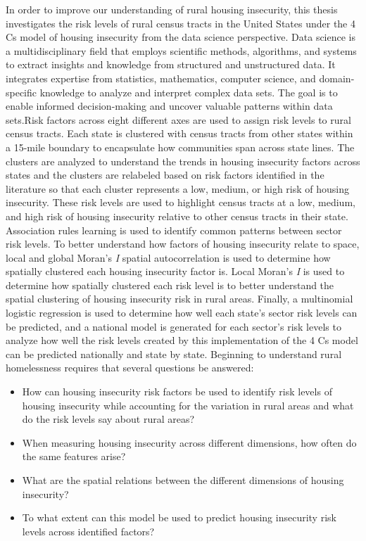  
In order to improve our understanding of rural housing insecurity, this thesis investigates the risk levels of rural census tracts in the United States under the 4 Cs model of housing insecurity from the data science perspective. Data science is a multidisciplinary field that employs scientific methods, algorithms, and systems to extract insights and knowledge from structured and unstructured data. It integrates expertise from statistics, mathematics, computer science, and domain-specific knowledge to analyze and interpret complex data sets. The goal is to enable informed decision-making and uncover valuable patterns within data sets.Risk factors across eight different axes are used to assign risk levels to rural census tracts. Each state is clustered with census tracts from other states within a 15-mile boundary to encapsulate how communities span across state lines. The clusters are analyzed to understand the trends in housing insecurity factors across states and the clusters are relabeled based on risk factors identified in the literature so that each cluster represents a low, medium, or high risk of housing insecurity. These risk levels are used to highlight census tracts at a low, medium, and high risk of housing insecurity relative to other census tracts in their state. Association rules learning is used to identify common patterns between sector risk levels. To better understand how factors of housing insecurity relate to space, local and global Moran's \textit{I} spatial autocorrelation is used to determine how spatially clustered each housing insecurity factor is. Local Moran's \textit{I} is used to determine how spatially clustered each risk level is to better understand the spatial clustering of housing insecurity risk in rural areas. Finally, a multinomial logistic regression is used to determine how well each state's sector risk levels can be predicted, and a national model is generated for each sector's risk levels to analyze how well the risk levels created by this implementation of the 4 Cs model can be predicted nationally and state by state. Beginning to understand rural homelessness requires that several questions be answered:
    \begin{itemize}
      \item How can housing insecurity risk factors be used to identify risk levels of housing insecurity while accounting for the variation in rural areas and what do the risk levels say about rural areas?
      \item When measuring housing insecurity across different dimensions, how often do the same features arise?
      \item What are the spatial relations between the different dimensions of housing insecurity?
      \item To what extent can this model be used to predict housing insecurity risk levels across identified factors?
    \end{itemize}

